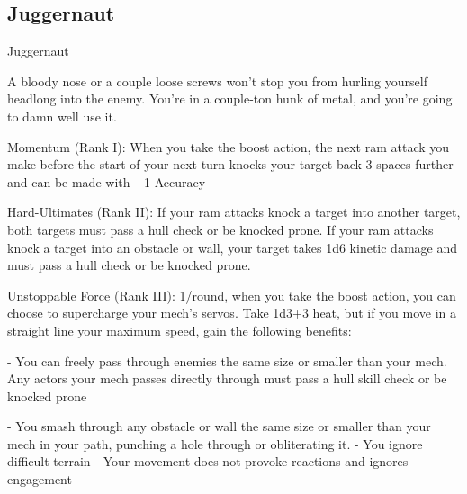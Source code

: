 \subsection{Juggernaut}

                                                Juggernaut  

A bloody nose or a couple loose screws won’t stop you from hurling yourself headlong into the enemy.  
You’re in a couple-ton hunk of metal, and you’re going to damn well use it.  

Momentum (Rank I): When you take the boost action, the next ram attack you make before the  
start of your next turn knocks your target back 3 spaces further and can be made with +1  
Accuracy
 
Hard-Ultimates (Rank II): If your ram attacks knock a target into another target, both targets  
must pass a hull check or be knocked prone. If your ram attacks knock a target into an obstacle  
or wall, your target takes 1d6 kinetic damage and must pass a hull check or be knocked prone.
 
Unstoppable Force (Rank III): 1/round, when you take the boost action, you can choose to  
supercharge your mech’s servos. Take 1d3+3 heat, but if you move in a straight line your  
maximum speed, gain the following benefits:
 
             -    You can freely pass through enemies the same size or smaller than your mech.  
                 Any actors your mech passes directly through must pass a hull skill check or be  
                  knocked prone
 
             -    You smash through any obstacle or wall the same size or smaller than your mech  
                  in your path, punching a hole through or obliterating it.  
             -    You ignore difficult terrain  
             -    Your movement does not provoke reactions and ignores engagement  